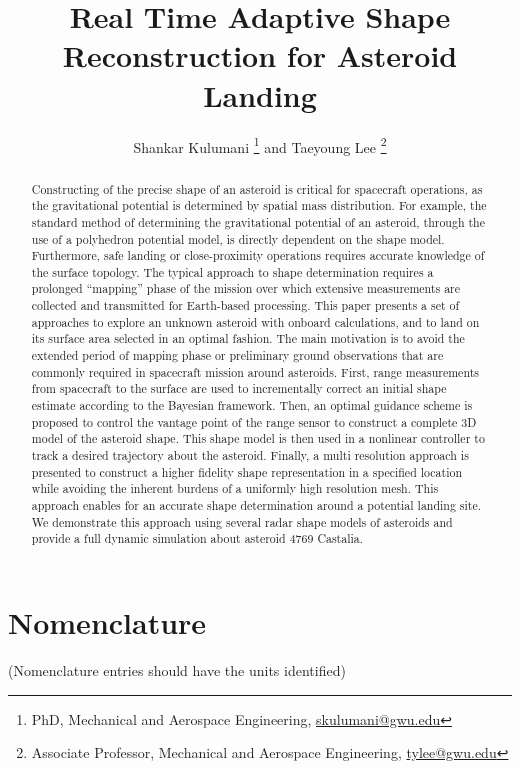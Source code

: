 \documentclass[journal]{new-aiaa}
\title{Real Time Adaptive Shape Reconstruction for Asteroid Landing}
\author{Shankar Kulumani \footnote{PhD, Mechanical and Aerospace Engineering, \href{mailto:skulumani@gwu.edu}{skulumani@gwu.edu}}
and
Taeyoung Lee \footnote{Associate Professor, Mechanical and Aerospace Engineering, \href{mailto:tylee@gwu.edu}{tylee@gwu.edu}}}
\affil{The George Washington University, Washington, DC, 20052}
\begin{document}
\maketitle

\begin{abstract}
    Constructing of the precise shape of an asteroid is critical for spacecraft operations, as the gravitational potential is determined by spatial mass distribution.
    For example, the standard method of determining the gravitational potential of an asteroid, through the use of a polyhedron potential model, is directly dependent on the shape model.
    Furthermore, safe landing or close-proximity operations requires accurate knowledge of the surface topology. 
    The typical approach to shape determination requires a prolonged ``mapping'' phase of the mission over which extensive measurements are collected and transmitted for Earth-based processing.
    This paper presents a set of approaches to explore an unknown asteroid with onboard calculations, and to land on its surface area selected in an optimal fashion. 
    The main motivation is to avoid the extended period of mapping phase or preliminary ground observations that are commonly required in spacecraft mission around asteroids. 
    First, range measurements from spacecraft to the surface are used to incrementally correct an initial shape estimate according to the Bayesian framework. 
    Then, an optimal guidance scheme is proposed to control the vantage point of the range sensor to construct a complete 3D model of the asteroid shape. 
    This shape model is then used in a nonlinear controller to track a desired trajectory about the asteroid.
    Finally, a multi resolution approach is presented to construct a higher fidelity shape representation in a specified location while avoiding the inherent burdens of a uniformly high resolution mesh. 
    This approach enables for an accurate shape determination around a potential landing site.
    We demonstrate this approach using several radar shape models of asteroids and provide a full dynamic simulation about asteroid 4769 Castalia.
\end{abstract}

\section*{Nomenclature}

\noindent(Nomenclature entries should have the units identified)
\end{document}
